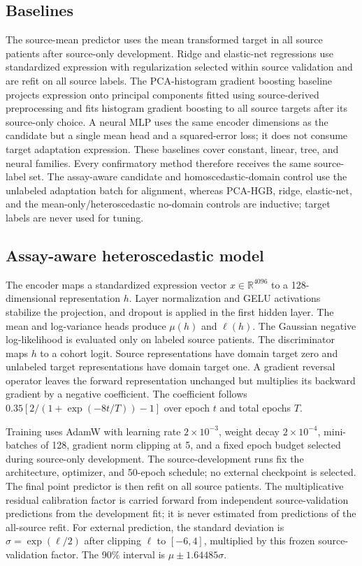 \documentclass[11pt]{article}
\begin{document}
\subsection{Baselines}
The source-mean predictor uses the mean transformed target in all source patients after source-only development. Ridge and elastic-net regressions use standardized expression with regularization selected within source validation and are refit on all source labels. The PCA-histogram gradient boosting baseline projects expression onto principal components fitted using source-derived preprocessing and fits histogram gradient boosting to all source targets after its source-only choice. A neural MLP uses the same encoder dimensions as the candidate but a single mean head and a squared-error loss; it does not consume target adaptation expression. These baselines cover constant, linear, tree, and neural families. Every confirmatory method therefore receives the same source-label set. The assay-aware candidate and homoscedastic-domain control use the unlabeled adaptation batch for alignment, whereas PCA-HGB, ridge, elastic-net, and the mean-only/heteroscedastic no-domain controls are inductive; target labels are never used for tuning.

\subsection{Assay-aware heteroscedastic model}
The encoder maps a standardized expression vector $x\in\mathbb{R}^{4096}$ to a 128-dimensional representation $h$. Layer normalization and GELU activations stabilize the projection, and dropout is applied in the first hidden layer. The mean and log-variance heads produce $\mu(h)$ and $\ell(h)$. The Gaussian negative log-likelihood is evaluated only on labeled source patients. The discriminator maps $h$ to a cohort logit. Source representations have domain target zero and unlabeled target representations have domain target one. A gradient reversal operator leaves the forward representation unchanged but multiplies its backward gradient by a negative coefficient. The coefficient follows $0.35[2/(1+\exp(-8t/T))-1]$ over epoch $t$ and total epochs $T$.

Training uses AdamW with learning rate $2\times10^{-3}$, weight decay $2\times10^{-4}$, mini-batches of 128, gradient norm clipping at 5, and a fixed epoch budget selected during source-only development. The source-development runs fix the architecture, optimizer, and 50-epoch schedule; no external checkpoint is selected. The final point predictor is then refit on all source patients. The multiplicative residual calibration factor is carried forward from independent source-validation predictions from the development fit; it is never estimated from predictions of the all-source refit. For external prediction, the standard deviation is $\sigma=\exp(\ell/2)$ after clipping $\ell$ to $[-6,4]$, multiplied by this frozen source-validation factor. The 90\% interval is $\mu\pm1.64485\sigma$.
\end{document}
